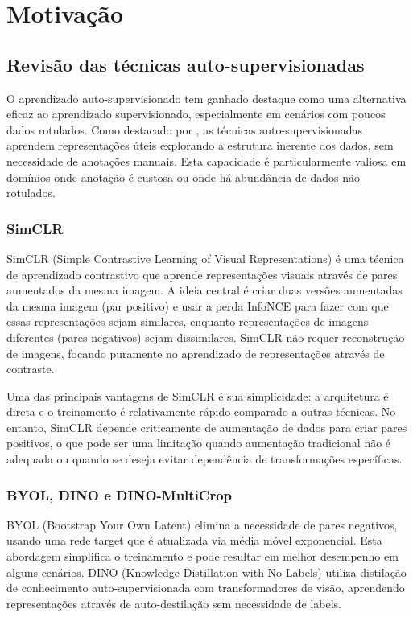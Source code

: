 \chapter{Motivação}

\section{Revisão das técnicas auto-supervisionadas}

O aprendizado auto-supervisionado tem ganhado destaque como uma alternativa eficaz ao aprendizado supervisionado, especialmente em cenários com poucos dados rotulados. Como destacado por \cite{chen2020simclr}, as técnicas auto-supervisionadas aprendem representações úteis explorando a estrutura inerente dos dados, sem necessidade de anotações manuais. Esta capacidade é particularmente valiosa em domínios onde anotação é custosa ou onde há abundância de dados não rotulados.

\subsection{SimCLR}

SimCLR (Simple Contrastive Learning of Visual Representations) \cite{chen2020simclr} é uma técnica de aprendizado contrastivo que aprende representações visuais através de pares aumentados da mesma imagem. A ideia central é criar duas versões aumentadas da mesma imagem (par positivo) e usar a perda InfoNCE para fazer com que essas representações sejam similares, enquanto representações de imagens diferentes (pares negativos) sejam dissimilares. SimCLR não requer reconstrução de imagens, focando puramente no aprendizado de representações através de contraste.

Uma das principais vantagens de SimCLR é sua simplicidade: a arquitetura é direta e o treinamento é relativamente rápido comparado a outras técnicas. No entanto, SimCLR depende criticamente de aumentação de dados para criar pares positivos, o que pode ser uma limitação quando aumentação tradicional não é adequada ou quando se deseja evitar dependência de transformações específicas.

\subsection{BYOL, DINO e DINO-MultiCrop}

BYOL (Bootstrap Your Own Latent) \cite{grill2020byol} elimina a necessidade de pares negativos, usando uma rede target que é atualizada via média móvel exponencial. Esta abordagem simplifica o treinamento e pode resultar em melhor desempenho em alguns cenários. DINO (Knowledge Distillation with No Labels) \cite{caron2021dino} utiliza distilação de conhecimento auto-supervisionada com transformadores de visão, aprendendo representações através de auto-destilação sem necessidade de labels.

